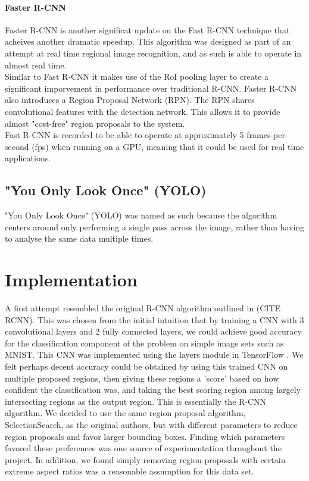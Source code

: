 \documentclass[10pt]{article}
\begin{document}
\paragraph{Faster R-CNN}
Faster R-CNN \cite{faster_rcnn} is another significat update on the Fast R-CNN technique that acheives another dramatic speedup. This algorithm was designed as part of an attempt at real time regional image recognition, and as such is able to operate in almost real time. \\
Similar to Fast R-CNN it makes use of the RoI pooling layer to create a significant imporvement in performance over traditional R-CNN. Faster R-CNN also introduces a Region Proposal Network (RPN). The RPN shares convolutional features with the detection network. This allows it to provide almost "cost-free" region proposals to the system. \\
Fast R-CNN is recorded to be able to operate at approximately 5 frames-per-second (fps) when running on a GPU, meaning that it could be used for real time applications.
	

\subsection{"You Only Look Once" (YOLO)}
"You Only Look Once" (YOLO) was named as such because the algorithm centers around only performing a single pass across the image, rather than having to analyse the same data multiple times.
	

\section{Implementation}
A first attempt resembled the original R-CNN algorithm outlined in (CITE RCNN). This was chosen from the initial intuition that by training a CNN with 3 convolutional layers and 2 fully connected layers, we could achieve good accuracy for the classification component of the problem on simple image sets such as MNIST. This CNN was implemented using the layers module in TensorFlow \cite{tensorflow}. We felt perhaps decent accuracy could be obtained by using this trained CNN on multiple proposed regions, then giving these regions a 'score' based on how confident the classification was, and taking the best scoring region among largely intersecting regions as the output region. This is essentially the R-CNN algorithm. We decided to use the same region proposal algorithm, SelectionSearch, as the original authors, but with different parameters to reduce region proposals and favor larger bounding boxes. Finding which parameters favored these preferences was one source of experimentation throughout the project. In addition, we found simply removing region proposals with certain extreme aspect ratios was a reasonable assumption for this data set.
\end{document}
